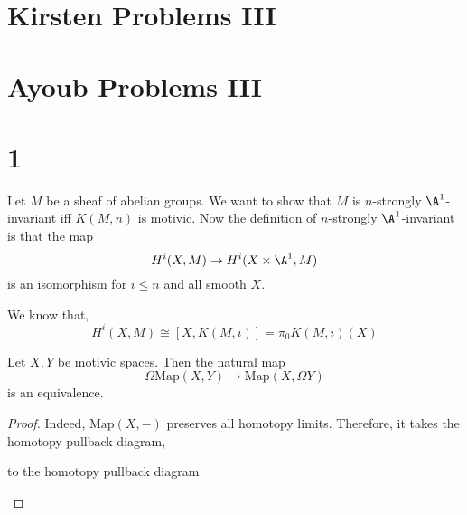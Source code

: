\documentclass{article}
\begin{document}
\section{Kirsten Problems III}



\section{Ayoub Problems III}

\section{1}

\newcommand{\Map}{\mathrm{Map}}

Let $M$ be a sheaf of abelian groups. We want to show that $M$ is $n$-strongly $\A^1$-invariant iff $K(M, n)$ is motivic. Now the definition of $n$-strongly $\A^1$-invariant is that the map
\[ H^i(X, M) \to H^i(X \times \A^1, M) \]
is an isomorphism for $i \le n$ and all smooth $X$. 
\par 
We know that,
\[ H^i(X, M) \cong [X, K(M,i)] = \pi_0 K(M,i)(X)\]

\begin{lemma}
Let $X, Y$ be motivic spaces. Then the natural map
\[ \Omega \Map(X, Y) \to \Map(X, \Omega Y) \]
is an equivalence. 
\end{lemma}

\begin{proof}
Indeed, $\Map(X, -)$ preserves all homotopy limits. Therefore, it takes the homotopy pullback diagram,
\begin{center}
\end{center}
to the homotopy pullback diagram
\begin{center}
\end{center}
\end{proof}
\end{document}
